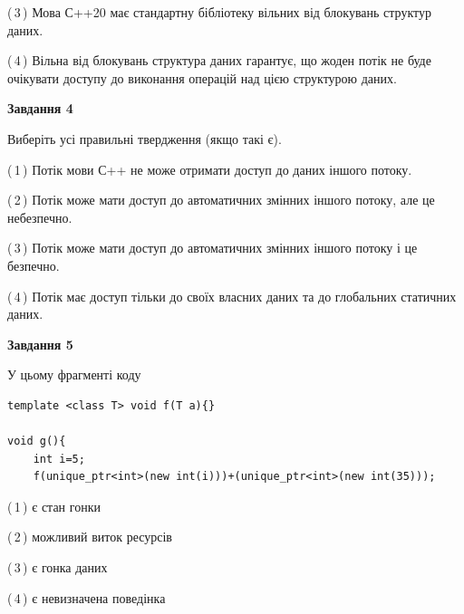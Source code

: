 \documentclass[12pt, ukrainian]{article}
\begin{document}
\begin {large}
{(\,3\,) Мова С++20 має стандартну бібліотеку вільних від блокувань структур даних.%

(\,4\,) Вільна від блокувань структура даних гарантує, що жоден потік не буде очікувати доступу до виконання операцій над цією структурою даних.%



\begin{center}
\textbf{Завдання 4}
\end{center}
Виберіть усі правильні твердження (якщо такі є).\par
\vspace{2mm}

(\,1\,) Потік мови С++ не може отримати доступ до даних іншого потоку.%

(\,2\,) Потік може мати доступ до автоматичних змінних іншого потоку, але це небезпечно.%

(\,3\,) Потік може мати доступ до автоматичних змінних іншого потоку і це безпечно.%

(\,4\,) Потік має доступ тільки до своїх власних даних та до глобальних статичних даних.%



\begin{center}
\textbf{Завдання 5}
\end{center}
У цьому фрагменті коду
\begin{verbatim}
template <class T> void f(T a){}

void g(){
    int i=5;
    f(unique_ptr<int>(new int(i)))+(unique_ptr<int>(new int(35)));
\end{verbatim}
(\,1\,) є стан гонки%

(\,2\,) можливий виток ресурсів%

(\,3\,) є гонка даних%

(\,4\,) є невизначена поведінка%


}
\end {large}
\end{document}
